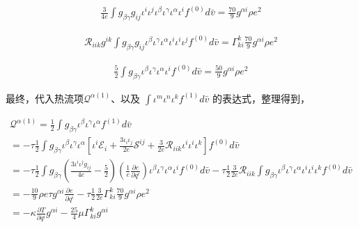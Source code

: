 \documentclass[LBMDerivation.tex]{subfiles}
\begin{document}
\begin{equation}
  \begin{gathered}
    \frac{3}{4e}\int g_{\beta\gamma} g_{ij} \iota^i\iota^j\iota^{\beta} \iota^{\gamma}  \iota^{\alpha} \iota^i   f^{(0)}  d \bar{v} =\frac{70}{9}g^{\alpha i}\rho e^2
  \end{gathered}
\end{equation}

\begin{equation}
  \begin{gathered}
    \mathcal{R}_{iik}g^{ik}\int g_{\beta\gamma} g_{ij}\iota^{\beta} \iota^{\gamma}  \iota^{\alpha} \iota^i\iota^i\iota^j   f^{(0)}  d \bar{v} =\Gamma_{ki}^k \frac{70}{9}g^{\alpha i}\rho e^2
  \end{gathered}
\end{equation}


\begin{equation}
  \begin{gathered}
    \frac{5}{2} \int g_{\beta\gamma} \iota^{\beta} \iota^{\gamma}  \iota^{\alpha} \iota^i   f^{(0)}  d \bar{v} =\frac{50}{9}g^{\alpha i}\rho e^2
  \end{gathered}
\end{equation}





最终，代入热流项$\mathcal{Q}^{\alpha (1)}$、以及 $\int \iota^m \iota^n  \iota^{k} f^{(1)}  d \bar{v}$ 的表达式，整理得到，


\begin{equation}
  \begin{gathered}
    \mathcal{Q}^{\alpha (1)} = \frac{1}{2}\int g_{\beta\gamma} \iota^{\beta} \iota^{\gamma}  \iota^{\alpha} f^{(1)}  d \bar{v}\\
    = -\tau  \frac{1}{2}\int g_{\beta\gamma} \iota^{\beta} \iota^{\gamma}  \iota^{\alpha}  [\iota^i\mathcal{E}_i
      +\frac{3\iota_i \iota_j}{2e} \mathcal{S}^{ij}
      + \frac{3}{2e} \mathcal{R}_{iik} \iota^i\iota^i\iota^k
    ]{f^{(0)}} d \bar{v}  \\
    = -\tau  \frac{1}{2} \int g_{\beta\gamma} (\frac{3 {\iota^i\iota^jg_{ij}}}{4e}-\frac{5}{2}) (\frac{1}{e}\frac{\partial e}{\partial q^i})\iota^{\beta} \iota^{\gamma}  \iota^{\alpha} \iota^i   f^{(0)}  d \bar{v}  - \tau \frac{1}{2} \frac{3}{2e} \mathcal{R}_{iik}\int g_{\beta\gamma} \iota^{\beta} \iota^{\gamma}  \iota^{\alpha} \iota^i\iota^i\iota^k   f^{(0)}  d \bar{v}  \\
    = -\frac{10}{9}\rho e \tau g^{\alpha i}\frac{\partial e}{\partial q^i} -  \tau \frac{1}{2} \frac{3}{2e}  \Gamma_{ki}^k \frac{70}{9}g^{\alpha i}\rho e^2\\
    = -\kappa \frac{\partial T}{\partial q^i} g^{\alpha i} - \frac{25}{4}\mu \Gamma_{ki}^{k}g^{\alpha i}
  \end{gathered}
\end{equation}
\end{document}
